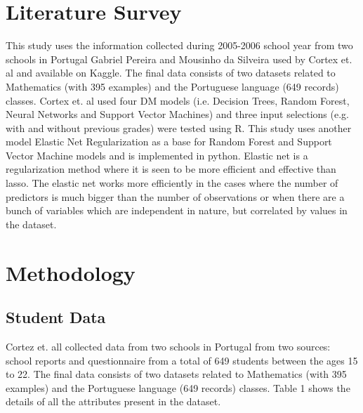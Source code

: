 \documentclass[conference]{IEEEtran}
\begin{document}
\section{Literature Survey}
This study uses the information collected during 2005-2006 school year from two schools in Portugal Gabriel Pereira and Mousinho da Silveira used by Cortex et. al\cite{cortez2008using} and available on Kaggle\cite{Doe:2009:Online}. The final data consists of two datasets related to Mathematics (with 395 examples) and the Portuguese language (649 records) classes. Cortex et. al used four DM models (i.e. Decision Trees, Random Forest, Neural Networks
and Support Vector Machines) and three input selections (e.g. with and without previous grades) were tested using R. This study uses another model Elastic Net Regularization as a base for Random Forest and Support Vector Machine models and is implemented in python. Elastic net\cite{zou2005regularization} is a regularization method where it is seen to be more efficient and effective than lasso. The elastic net works more efficiently in the cases where the number of predictors is much bigger than the number of observations or when there are a bunch of variables which are independent in nature, but correlated by values in the dataset.

\section{Methodology}
\subsection{Student Data}
Cortez et. all\cite{cortez2008using} collected data from two schools in Portugal from two sources: school reports and questionnaire from a total of 649 students between the ages 15 to 22. The final data consists of two datasets related to Mathematics (with 395 examples) and the Portuguese language (649 records) classes. Table 1 shows the details of all the attributes present in the dataset.
\end{document}
